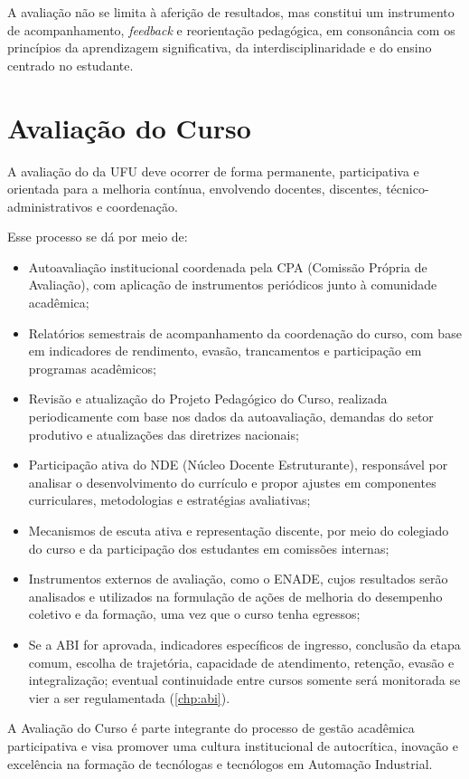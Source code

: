 A avaliação não se limita à aferição de resultados, mas constitui um instrumento de acompanhamento, \textit{feedback} e reorientação pedagógica, em consonância com os princípios da aprendizagem significativa, da interdisciplinaridade e do ensino centrado no estudante.

\section{Avaliação do Curso}

A avaliação do \ppccurso da UFU deve ocorrer de forma permanente, participativa e orientada para a melhoria contínua, envolvendo docentes, discentes, técnico-administrativos e coordenação.

Esse processo se dá por meio de:

\begin{itemize}
    \item Autoavaliação institucional coordenada pela CPA (Comissão Própria de Avaliação), com aplicação de instrumentos periódicos junto à comunidade acadêmica;
    \item Relatórios semestrais de acompanhamento da coordenação do curso, com base em indicadores de rendimento, evasão, trancamentos e participação em programas acadêmicos;
    \item Revisão e atualização do Projeto Pedagógico do Curso, realizada periodicamente com base nos dados da autoavaliação, demandas do setor produtivo e atualizações das diretrizes nacionais;
    \item Participação ativa do NDE (Núcleo Docente Estruturante), responsável por analisar o desenvolvimento do currículo e propor ajustes em componentes curriculares, metodologias e estratégias avaliativas;
    \item Mecanismos de escuta ativa e representação discente, por meio do colegiado do curso e da participação dos estudantes em comissões internas;
    \item Instrumentos externos de avaliação, como o ENADE, cujos resultados serão analisados e utilizados na formulação de ações de melhoria do desempenho coletivo e da formação, uma vez que o curso tenha egressos;
    \item Se a ABI for aprovada, indicadores específicos de ingresso, conclusão da etapa comum, escolha de trajetória, capacidade de atendimento, retenção, evasão e integralização; eventual continuidade entre cursos somente será monitorada se vier a ser regulamentada (\autoref{chp:abi}).
\end{itemize}

A Avaliação do Curso é parte integrante do processo de gestão acadêmica participativa e visa promover uma cultura institucional de autocrítica, inovação e excelência na formação de tecnólogas e tecnólogos em Automação Industrial.
